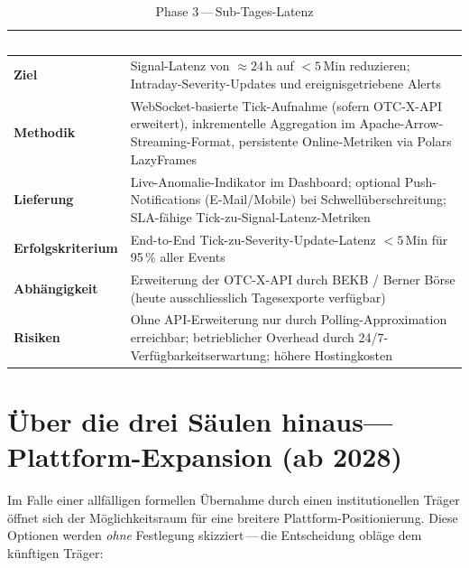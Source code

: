 \documentclass[11pt, a4paper, oneside, openany]{report}
\begin{document}
\begin{table}[H]
\centering
\caption{Phase 3\,---\,Sub-Tages-Latenz}
\label{tab:phase3}
\sffamily\small
\begin{tabularx}{\textwidth}{>{\bfseries\sffamily\color{SwissRed}}p{2.4cm} X}
  \toprule
  \rowcolor{DeepNavy} \textcolor{white}{\textbf{Aspekt}} & \textcolor{white}{\textbf{Inhalt}} \\
  \midrule
  Ziel          & Signal-Latenz von $\approx 24$\,h auf $< 5$\,Min reduzieren; Intraday-Severity-Updates und ereignisgetriebene Alerts \\
  Methodik      & WebSocket-basierte Tick-Aufnahme (sofern OTC-X-API erweitert), inkrementelle Aggregation im Apache-Arrow-Streaming-Format, persistente Online-Metriken via Polars LazyFrames \\
  Lieferung     & Live-Anomalie-Indikator im Dashboard; optional Push-Notifications (E-Mail/Mobile) bei Schwellüberschreitung; SLA-fähige Tick-zu-Signal-Latenz-Metriken \\
  Erfolgs\-kriterium & End-to-End Tick-zu-Severity-Update-Latenz $< 5$\,Min für 95\,\% aller Events \\
  Abhängig\-keit & Erweiterung der OTC-X-API durch BEKB / Berner Börse (heute ausschliesslich Tagesexporte verfügbar) \\
  Risiken       & Ohne API-Erweiterung nur durch Polling-Approximation erreichbar; betrieblicher Overhead durch 24/7-Verfügbarkeitserwartung; höhere Hostingkosten \\
  \bottomrule
\end{tabularx}
\end{table}

\section{Über die drei Säulen hinaus\;---\;Plattform-Expansion (ab 2028)}

Im Falle einer allfälligen formellen Übernahme durch einen institutionellen Träger öffnet sich der Möglichkeitsraum für eine breitere Plattform-Positionierung. Diese Optionen werden \emph{ohne} Festlegung skizziert\,---\,die Entscheidung obläge dem künftigen Träger:
\end{document}

